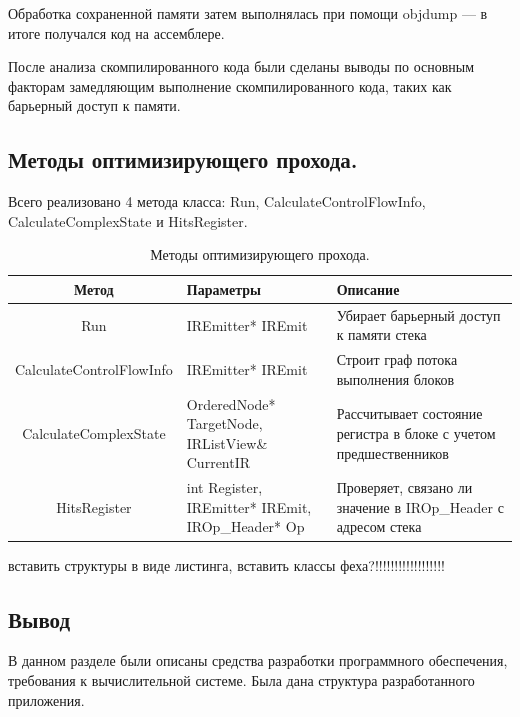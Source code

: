 Обработка сохраненной памяти затем выполнялась при помощи objdump \cite{objdump} --- в итоге получался код на ассемблере.

После анализа скомпилированного кода были сделаны выводы по основным факторам замедляющим выполнение скомпилированного кода, таких как барьерный доступ к памяти.

\subsection{Методы оптимизирующего прохода.}

Всего реализовано 4 метода класса: Run, CalculateControlFlowInfo, \\ CalculateComplexState и HitsRegister.

\begin{table}[!htb]
	\label{table:benches}
	\begin{center}
		\caption{Методы оптимизирующего прохода.}
		\begin{tabular}{|c|p{4.5cm}|p{5.5cm}|}
			\hline
			\bfseries Метод & \bfseries Параметры & \bfseries Описание \\
			\hline
			Run & IREmitter* IREmit & Убирает барьерный доступ к памяти стека \\ \hline
			CalculateControlFlowInfo & IREmitter* IREmit & Строит граф потока выполнения блоков \\ \hline
			CalculateComplexState & OrderedNode* TargetNode,
			IRListView\& CurrentIR & Рассчитывает состояние регистра в блоке с учетом предшественников \\ \hline
			HitsRegister & int Register, IREmitter* IREmit,
			IROp\_Header* Op & Проверяет, связано ли значение в IROp\_Header с адресом стека \\ \hline
		\end{tabular}
	\end{center}
\end{table}


вставить структуры в виде листинга, вставить классы феха?!!!!!!!!!!!!!!!!!!

\subsection{Вывод}

В данном разделе были описаны средства разработки программного
обеспечения, требования к вычислительной системе. Была дана структура
разработанного приложения.

\pagebreak